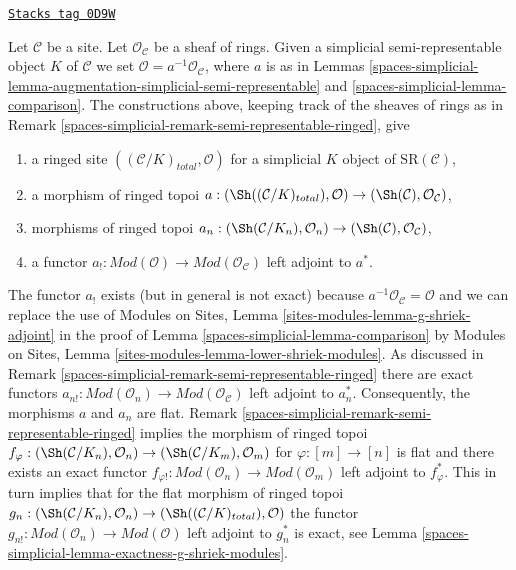 \begin{remark}

\label{spaces-simplicial-remark-augmentation-ringed}
\href{https://stacks.math.columbia.edu/tag/0D9W}{\texttt{Stacks tag 0D9W}}

Let $\mathcal{C}$ be a site. Let $\mathcal{O}_\mathcal{C}$ be a sheaf of rings.
Given a simplicial semi-representable object $K$ of $\mathcal{C}$
we set $\mathcal{O} = a^{-1}\mathcal{O}_\mathcal{C}$, where $a$
is as in Lemmas \ref{spaces-simplicial-lemma-augmentation-simplicial-semi-representable} and
\ref{spaces-simplicial-lemma-comparison}.
The constructions above, keeping track of the sheaves of rings
as in Remark \ref{spaces-simplicial-remark-semi-representable-ringed}, give
\begin{enumerate}
\item a ringed site $((\mathcal{C}/K)_{total}, \mathcal{O})$
for a simplicial $K$ object of $\text{SR}(\mathcal{C})$,
\item a morphism of ringed topoi
$a : (\Sh((\mathcal{C}/K)_{total}), \mathcal{O}) \to
(\Sh(\mathcal{C}), \mathcal{O}_\mathcal{C})$,
\item morphisms of ringed topoi
$a_n : (\Sh(\mathcal{C}/K_n), \mathcal{O}_n) \to
(\Sh(\mathcal{C}), \mathcal{O}_\mathcal{C})$,
\item a functor
$a_! : \textit{Mod}(\mathcal{O}) \to \textit{Mod}(\mathcal{O}_\mathcal{C})$
left adjoint to $a^*$.
\end{enumerate}
The functor $a_!$ exists (but in general is not exact)
because $a^{-1}\mathcal{O}_\mathcal{C} = \mathcal{O}$
and we can replace the use of
Modules on Sites, Lemma \ref{sites-modules-lemma-g-shriek-adjoint}
in the proof of Lemma \ref{spaces-simplicial-lemma-comparison}
by Modules on Sites, Lemma \ref{sites-modules-lemma-lower-shriek-modules}.
As discussed in Remark \ref{spaces-simplicial-remark-semi-representable-ringed}
there are exact functors
$a_{n!} : \textit{Mod}(\mathcal{O}_n) \to
\textit{Mod}(\mathcal{O}_\mathcal{C})$
left adjoint to $a_n^*$. Consequently, the morphisms $a$ and $a_n$ are flat.
Remark \ref{spaces-simplicial-remark-semi-representable-ringed}
implies the morphism of ringed topoi
$f_\varphi : (\Sh(\mathcal{C}/K_n), \mathcal{O}_n) \to
(\Sh(\mathcal{C}/K_m), \mathcal{O}_m)$
for $\varphi : [m] \to [n]$ is flat and there exists an exact functor
$f_{\varphi !} : \textit{Mod}(\mathcal{O}_n) \to \textit{Mod}(\mathcal{O}_m)$
left adjoint to $f_\varphi^*$. This in turn implies that for
the flat morphism of ringed topoi
$g_n : (\Sh(\mathcal{C}/K_n), \mathcal{O}_n) \to
(\Sh((\mathcal{C}/K)_{total}), \mathcal{O})$
the functor $g_{n!} : \textit{Mod}(\mathcal{O}_n) \to
\textit{Mod}(\mathcal{O})$ left adjoint to $g_n^*$ is exact, see
Lemma \ref{spaces-simplicial-lemma-exactness-g-shriek-modules}.
\end{remark}

